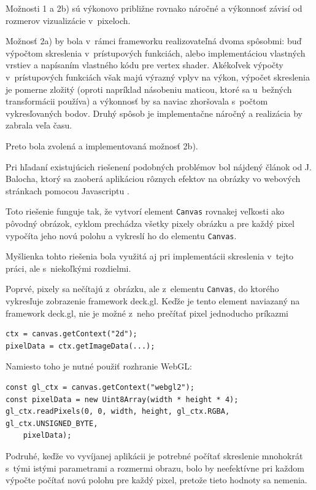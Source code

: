 Možnosti 1 a 2b) sú výkonovo približne rovnako náročné a výkonnosť závisí od rozmerov vizualizácie v~pixeloch.

Možnosť 2a) by bola v~rámci frameworku realizovateľná dvoma spôsobmi: buď výpočtom skreslenia v~prístupových funkciách, alebo implementáciou vlastných vrstiev a napísaním vlastného kódu pre vertex shader. Akékoľvek výpočty v~prístupových funkciách však majú výrazný vplyv na výkon, výpočet skreslenia je pomerne zložitý (oproti napríklad násobeniu maticou, ktoré sa u~bežných transformácii používa) a výkonnosť by sa naviac zhoršovala s~počtom vykresľovaných bodov. Druhý spôsob je implementačne náročný a realizácia by zabrala veľa času.

Preto bola zvolená a implementovaná možnosť 2b).

Pri hľadaní existujúcich riešenení podobných problémov bol nájdený článok od J. Balocha, ktorý sa zaoberá aplikáciou rôznych efektov na obrázky vo webových stránkach pomocou Javascriptu \cite{baloch_distortion_in_js}.

Toto riešenie funguje tak, že vytvorí element \texttt{Canvas} rovnakej veľkosti ako pôvodný obrázok, cyklom prechádza všetky pixely obrázku a pre každý pixel vypočíta jeho novú polohu a vykreslí ho do elementu \texttt{Canvas}.

Myšlienka tohto riešenia bola využitá aj pri implementácii skreslenia v~tejto práci, ale s~niekoľkými rozdielmi.

Poprvé, pixely sa nečítajú z~obrázku, ale z~elementu \texttt{Canvas}, do ktorého vykresľuje zobrazenie framework deck.gl. Keďže je tento element naviazaný na framework deck.gl, nie je možné z~neho prečítať pixel jednoducho príkazmi 

\begin{lstlisting}
ctx = canvas.getContext("2d");
pixelData = ctx.getImageData(...);
\end{lstlisting}

Namiesto toho je nutné použiť rozhranie WebGL:

\begin{lstlisting}
const gl_ctx = canvas.getContext("webgl2");
const pixelData = new Uint8Array(width * height * 4);
gl_ctx.readPixels(0, 0, width, height, gl_ctx.RGBA, gl_ctx.UNSIGNED_BYTE, 
    pixelData);
\end{lstlisting}

Podruhé, keďže vo vyvíjanej aplikácii je potrebné počítať skreslenie mnohokrát s~tými istými parametrami a rozmermi obrazu, bolo by neefektívne pri každom výpočte počítať novú polohu pre každý pixel, pretože tieto hodnoty sa nemenia.

